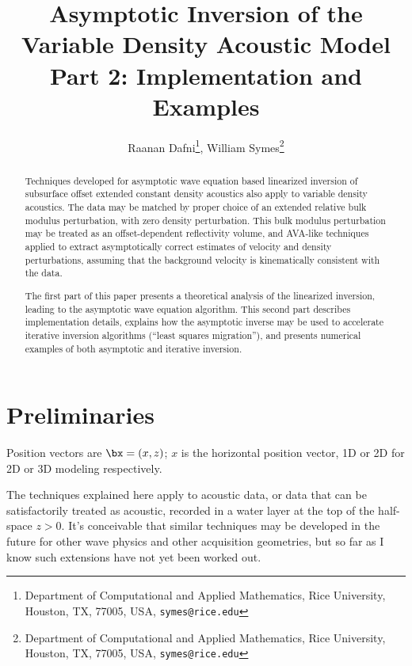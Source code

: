 \title{Asymptotic Inversion of the Variable Density Acoustic
  Model\\Part 2: Implementation and Examples}

\author{
Raanan Dafni\thanks{Department of Computational and Applied Mathematics, Rice University, 
Houston, TX, 77005, USA, 
{\tt symes@rice.edu}},
William Symes\thanks{Department of Computational and Applied Mathematics, Rice University, 
Houston, TX, 77005, USA, 
{\tt symes@rice.edu}}
}



\maketitle
\parskip 12pt

\begin{abstract}
Techniques developed for asymptotic wave equation based linearized inversion of
subsurface offset extended constant density acoustics also apply to variable density
acoustics. The data may be matched by proper choice of an extended
relative bulk modulus perturbation, with zero density
perturbation. This bulk modulus perturbation may be treated as an
offset-dependent reflectivity volume, and AVA-like techniques applied
to extract asymptotically correct estimates of velocity and density
perturbations, assuming that the background velocity is kinematically
consistent with the data. 

The first part of this paper presents a 
theoretical analysis of the linearized inversion, leading to the
asymptotic wave equation algorithm. This second part
describes implementation details, explains how the asymptotic inverse
may be used to accelerate iterative inversion algorithms (``least
squares migration''), and  presents numerical examples of both
asymptotic and iterative inversion.
\end{abstract}
\setlength{\parindent}{0cm}

\section{Preliminaries}

Position vectors are $\bx = (x,z)$; $x$ is the horizontal position
vector, 1D or 2D for 2D or 3D modeling respectively.

The techniques explained here apply to acoustic data, or data that can
be satisfactorily treated as acoustic, recorded in a water layer at
the top of the half-space $z>0$. It's conceivable that similar
techniques may be developed in the future for other wave physics and
other acquisition geometries, but so far as I know such extensions
have not yet been worked out.

